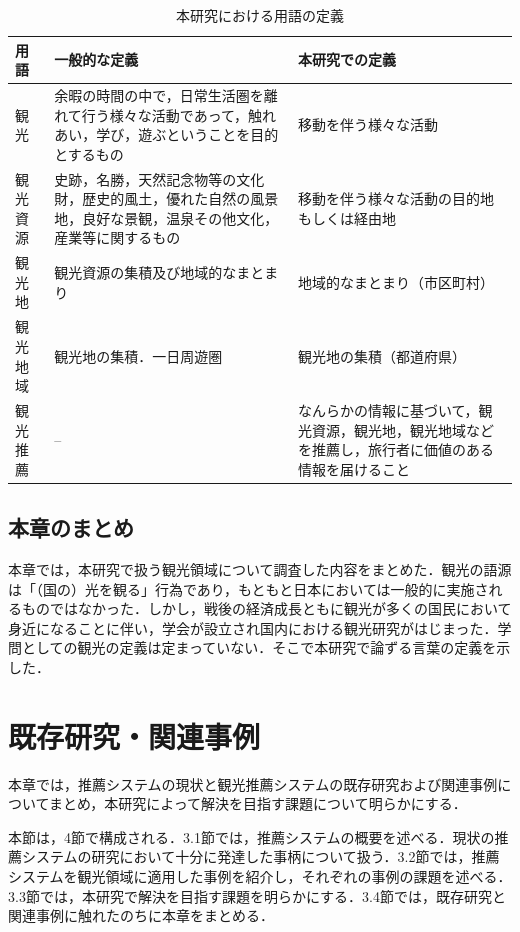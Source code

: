 \documentclass{jsarticle}
\begin{document}
\begin{table}[!h]
\small
\caption{本研究における用語の定義}
\begin{center}
\begin{tabular}{lp{}p{}}
\label{define_of_tourism}
用語 & 一般的な定義 & 本研究での定義 \\ \hline
観光        & 余暇の時間の中で，日常生活圏を離れて行う様々な活動であって，触れあい，学び，遊ぶということを目的とするもの        & 移動を伴う様々な活動 \\
観光資源    & 史跡，名勝，天然記念物等の文化財，歴史的風土，優れた自然の風景地，良好な景観，温泉その他文化，産業等に関するもの  & 移動を伴う様々な活動の目的地もしくは経由地 \\
観光地      & 観光資源の集積及び地域的なまとまり    & 地域的なまとまり（市区町村） \\
観光地域    & 観光地の集積．一日周遊圏              & 観光地の集積（都道府県） \\
観光推薦    & --                                    & なんらかの情報に基づいて，観光資源，観光地，観光地域などを推薦し，旅行者に価値のある情報を届けること
\end{tabular}
\end{center}
\end{table}

\subsection{本章のまとめ}

本章では，本研究で扱う観光領域について調査した内容をまとめた．観光の語源は「（国の）光を観る」行為であり，もともと日本においては一般的に実施されるものではなかった．しかし，戦後の経済成長ともに観光が多くの国民において身近になることに伴い，学会が設立され国内における観光研究がはじまった．学問としての観光の定義は定まっていない．そこで本研究で論ずる言葉の定義を示した．

\newpage

\section{既存研究・関連事例}

本章では，推薦システムの現状と観光推薦システムの既存研究および関連事例についてまとめ，本研究によって解決を目指す課題について明らかにする．

本節は，4節で構成される．3.1節では，推薦システムの概要を述べる．現状の推薦システムの研究において十分に発達した事柄について扱う．3.2節では，推薦システムを観光領域に適用した事例を紹介し，それぞれの事例の課題を述べる．3.3節では，本研究で解決を目指す課題を明らかにする．3.4節では，既存研究と関連事例に触れたのちに本章をまとめる．
\end{document}
